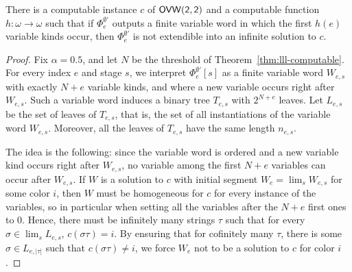 %

\begin{theorem}\label{thm:ovw-delta2}
There is a computable instance $c$ of $\sf{OVW}(2,2)$ and a computable function $h : \omega \to \omega$ such that if $\Phi_e^{\emptyset'}$ outputs a finite variable word in which the first $h(e)$ variable kinds occur, then $\Phi_e^{\emptyset'}$ is not extendible into an infinite solution to $c$.
\end{theorem}
\begin{proof}
Fix $\alpha = 0.5$, and let $N$ be the threshold of Theorem~\ref{thm:lll-computable}. For every index $e$ and stage $s$, we interpret $\Phi^{\emptyset'}_e[s]$ as a finite variable word $W_{e,s}$ with exactly $N+e$ variable kinds, and where a new variable occurs right after $W_{e,s}$. Such a variable word induces a binary tree $T_{e,s}$ with $2^{N+e}$ leaves. Let $L_{e,s}$ be the set of leaves of $T_{e,s}$, that is, the set of all instantiations of the variable word $W_{e,s}$. Moreover, all the leaves of $T_{e,s}$ have the same length $n_{e,s}$.

The idea is the following: since the variable word is ordered and a new variable kind occurs right after $W_{e,s}$, no variable among the first $N+e$ variables can occur after $W_{e,s}$. If $W$ is a solution to $c$ with initial segment $W_e = \lim_s W_{e,s}$ for some color $i$, then $W$ must be homogeneous for $c$ for every instance of the variables, so in particular when setting all the variables after the $N+e$ first ones to 0. Hence, there must be infinitely many strings $\tau$ such that for every $\sigma \in \lim_s L_{e,s}$, $c(\sigma\tau) = i$. By ensuring that for cofinitely many $\tau$, there is some  $\sigma \in L_{e,|\tau|}$ such that $c(\sigma\tau) \neq i$, we force $W_e$ not to be a solution to $c$ for color $i$.



\end{proof}
